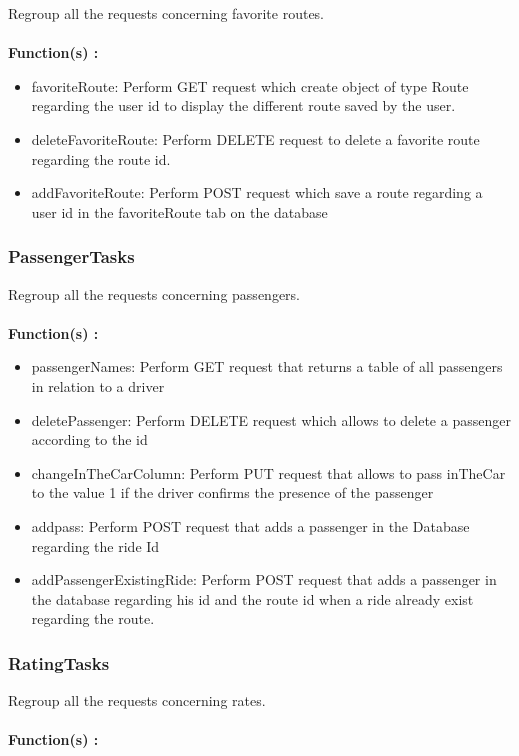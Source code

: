 Regroup all the requests concerning favorite routes.
\\\\
\textbf{Function(s) :}

\begin{itemize}
\item favoriteRoute: Perform GET request which create object of type Route regarding the user id to display the different route saved by the user.
\item deleteFavoriteRoute: Perform DELETE request to delete a favorite route regarding the route id.
\item addFavoriteRoute: Perform POST request which save a route regarding a user id in the favoriteRoute tab on the database
\end{itemize}

\subsubsection{PassengerTasks}

Regroup all the requests concerning passengers.
\\\\
\textbf{Function(s) :}

\begin{itemize}
\item passengerNames: Perform GET request that returns a table of all passengers in relation to a driver
\item deletePassenger: Perform DELETE request which allows to delete a passenger according to the id
\item changeInTheCarColumn: Perform PUT request that allows to pass inTheCar to the value 1 if the driver confirms the presence of the passenger
\item addpass: Perform POST request that adds a passenger in the Database regarding the ride Id
\item addPassengerExistingRide: Perform POST request that adds a passenger in the database regarding his id and the route id when a ride already exist regarding the route.
\end{itemize}

\subsubsection{RatingTasks}

Regroup all the requests concerning rates.
\\\\
\textbf{Function(s) :}

